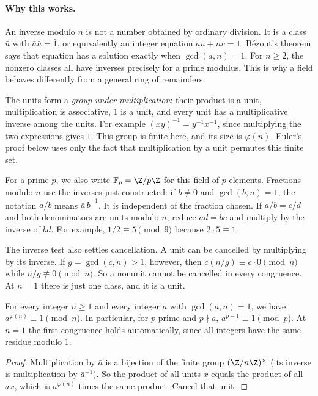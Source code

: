 \paragraph{Why this works.}
An inverse modulo $n$ is not a number obtained by ordinary division. It is a class $\bar u$ with $\bar a\bar u=\bar1$, or equivalently an integer equation $au+nv=1$. B\'ezout's theorem says that equation has a solution exactly when $\gcd(a,n)=1$. For $n\ge2$, the nonzero classes all have inverses precisely for a prime modulus. This is why a field behaves differently from a general ring of remainders.

The units form a \emph{group under multiplication}: their product is a unit, multiplication is associative, $1$ is a unit, and every unit has a multiplicative inverse among the units. For example $(xy)^{-1}=y^{-1}x^{-1}$, since multiplying the two expressions gives $1$. This group is finite here, and its size is $\varphi(n)$. Euler's proof below uses only the fact that multiplication by a unit permutes this finite set.

For a prime $p$, we also write $\mathbb F_p=\Z/p\Z$ for this field of $p$ elements. Fractions modulo $n$ use the inverses just constructed: if $b\ne0$ and $\gcd(b,n)=1$, the notation $a/b$ means $\bar a\,\bar b^{-1}$. It is independent of the fraction chosen. If $a/b=c/d$ and both denominators are units modulo $n$, reduce $ad=bc$ and multiply by the inverse of $bd$. For example, $1/2\equiv5\pmod9$ because $2\cdot5\equiv1$.

The inverse test also settles cancellation. A unit can be cancelled by multiplying by its inverse. If $g=\gcd(c,n)>1$, however, then $c(n/g)\equiv c\cdot0\pmod n$ while $n/g\not\equiv0\pmod n$. So a nonunit cannot be cancelled in every congruence. At $n=1$ there is just one class, and it is a unit.

\begin{theorem}\label{thm:eulerthm}
For every integer $n\ge1$ and every integer $a$ with $\gcd(a,n)=1$, we have $a^{\varphi(n)}\equiv1\pmod n$. In particular, for $p$ prime and $p\nmid a$, $a^{p-1}\equiv1\pmod p$. At $n=1$ the first congruence holds automatically, since all integers have the same residue modulo $1$.
\end{theorem}
\begin{proof}
Multiplication by $\bar a$ is a bijection of the finite group $(\Z/n\Z)^\times$ (its inverse is multiplication by $\bar a^{-1}$). So the product of all units $x$ equals the product of all $\bar ax$, which is $\bar a^{\varphi(n)}$ times the same product. Cancel that unit.
\end{proof}

